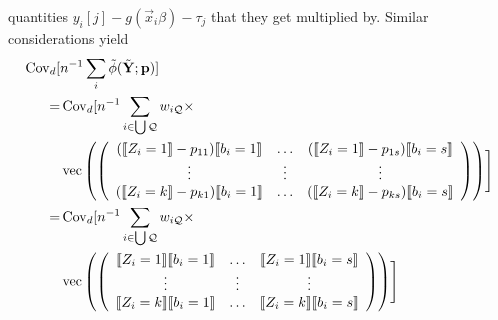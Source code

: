\documentclass{article}
\DeclarePairedDelimiter{\indicator}{\llbracket}{\rrbracket}
\begin{document}
quantities
$y_{i}[j] - g(\vec{x}_{i}\beta) - \tau_{j}$ that they get
multiplied by.  Similar  considerations yield
\begin{align}
\operatorname{Cov}_{d}[
  &n^{-1}\sum_{i}\tilde{\phi}(\tilde{\mathbf{Y}}; \mathbf{p})] \nonumber\\
  =&\operatorname{Cov}_{d}[n^{-1}
                                                 \sum_{i \in \bigcup
     \mathcal{Q}} w_{i\mathcal{Q}} \times \nonumber \\
&  \operatorname{vec}\left(%
                                                 \left(
                                                 \begin{array}{ccc}
                                                   (\indicator{Z_{i}=1}-p_{11})\indicator{b_{i}=1}&\ldots&(\indicator{Z_{i}=1}-p_{1s})\indicator{b_{i}=s}\\
                                                   \vdots & \vdots &
                                                                     \vdots
                                                   \\
                                                   (\indicator{Z_{i}=k}-p_{k1})\indicator{b_{i}=1}&\ldots&(\indicator{Z_{i}=k}-p_{ks})\indicator{b_{i}=s}\\                                                   
                                                 \end{array}
  \right)%
  \right)
  \Biggr] \nonumber \\ 
  =&\operatorname{Cov}_{d}[n^{-1}
                                                 \sum_{i \in \bigcup
     \mathcal{Q}} w_{i\mathcal{Q}} \times \nonumber \\
  &\operatorname{vec}\left(%
                                                 \left(
                                                 \begin{array}{ccc}
                                                   \indicator{Z_{i}=1}\indicator{b_{i}=1}&\ldots&\indicator{Z_{i}=1}\indicator{b_{i}=s}\\
                                                   \vdots & \vdots &
                                                                     \vdots
                                                   \\
                                                   \indicator{Z_{i}=k}\indicator{b_{i}=1}&\ldots&\indicator{Z_{i}=k}\indicator{b_{i}=s}\\                                                   
                                                 \end{array}  
  \right)%
  \right)
    \Biggr] \label{eq:11}
\end{align}
\end{document}
